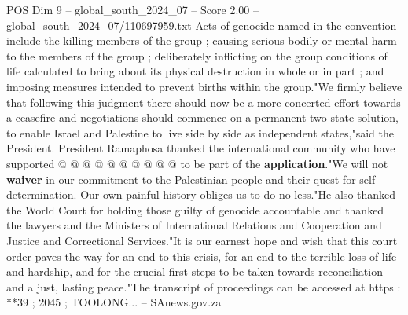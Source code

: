 \begin{textsample}{POS Dim 9 – global\_south\_2024\_07 – Score 2.00 – global\_south\_2024\_07/110697959.txt}
Acts of genocide named in the convention include the killing members of the group ; causing serious bodily or mental harm to the members of the group ; deliberately inflicting on the group conditions of life calculated to bring about its physical destruction in whole or in part ; and imposing measures intended to prevent births within the group."We firmly believe that following this judgment there should now be a more concerted effort towards a ceasefire and negotiations should commence on a permanent two-state solution, to enable Israel and Palestine to live side by side as independent states,"said the President.
President Ramaphosa thanked the international community who have supported @ @ @ @ @ @ @ @ @ @ to be part of the \textbf{application}."We will not \textbf{waiver} in our commitment to the Palestinian people and their quest for self-determination.
Our own painful history obliges us to do no less."He also thanked the World Court for holding those guilty of genocide accountable and thanked the lawyers and the Ministers of International Relations and Cooperation and Justice and Correctional Services."It is our earnest hope and wish that this court order paves the way for an end to this crisis, for an end to the terrible loss of life and hardship, and for the crucial first steps to be taken towards reconciliation and a just, lasting peace."The transcript of proceedings can be accessed at https : **39 ; 2045 ; TOOLONG... -- SAnews.gov.za

\end{textsample}
